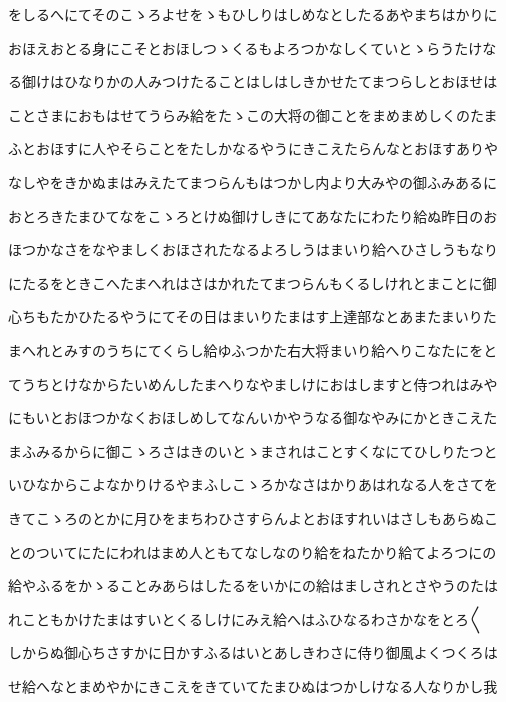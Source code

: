 \documentclass[a4paper,11pt,landscape]{ltjtarticle}
\begin{document}
\par\medskip
をしるへにてそのこゝろよせをゝもひしりはしめなとしたるあやまちはかりに
\par\medskip
おほえおとる身にこそとおほしつゝくるもよろつかなしくていとゝらうたけな
\par\medskip
る御けはひなりかの人みつけたることはしはしきかせたてまつらしとおほせは
\par\medskip
ことさまにおもはせてうらみ給をたゝこの大将の御ことをまめまめしくのたま
\par\medskip
ふとおほすに人やそらことをたしかなるやうにきこえたらんなとおほすありや
\par\medskip
なしやをきかぬまはみえたてまつらんもはつかし内より大みやの御ふみあるに
\par\medskip
おとろきたまひてなをこゝろとけぬ御けしきにてあなたにわたり給ぬ昨日のお
\par\medskip
ほつかなさをなやましくおほされたなるよろしうはまいり給へひさしうもなり
\par\medskip
にたるをときこへたまへれはさはかれたてまつらんもくるしけれとまことに御
\par\medskip
心ちもたかひたるやうにてその日はまいりたまはす上達部なとあまたまいりた
\par\medskip
まへれとみすのうちにてくらし給ゆふつかた右大将まいり給へりこなたにをと
\par\medskip
てうちとけなからたいめんしたまへりなやましけにおはしますと侍つれはみや
\par\medskip
にもいとおほつかなくおほしめしてなんいかやうなる御なやみにかときこえた
\par\medskip
まふみるからに御こゝろさはきのいとゝまされはことすくなにてひしりたつと
\par\medskip
いひなからこよなかりけるやまふしこゝろかなさはかりあはれなる人をさてを
\par\medskip
きてこゝろのとかに月ひをまちわひさすらんよとおほすれいはさしもあらぬこ
\par\medskip
とのついてにたにわれはまめ人ともてなしなのり給をねたかり給てよろつにの
\par\medskip
給やふるをかゝることみあらはしたるをいかにの給はましされとさやうのたは
\par\medskip
れこともかけたまはすいとくるしけにみえ給へはふひなるわさかなをとろ〱
\par\medskip
しからぬ御心ちさすかに日かすふるはいとあしきわさに侍り御風よくつくろは
\par\medskip
せ給へなとまめやかにきこえをきていてたまひぬはつかしけなる人なりかし我
\end{document}
